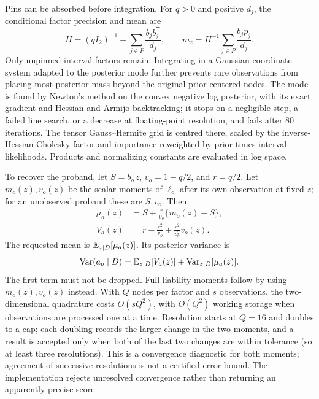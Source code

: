 Pins can be absorbed before integration. For $q>0$ and positive $d_j$, the
conditional factor precision and mean are
\begin{equation}
 H=(qI_2)^{-1}+\sum_{j\in P}\frac{b_jb_j^\mathsf{T}}{d_j},\qquad
 m_z=H^{-1}\sum_{j\in P}\frac{b_jp_j}{d_j}.
 \label{eq:factor-pins}
\end{equation}
Only unpinned interval factors remain. Integrating in a Gaussian coordinate
system adapted to the posterior mode further prevents rare observations
from placing most posterior mass beyond the original prior-centered nodes.
The mode is found by Newton's method on the convex negative log
posterior, with its exact gradient and Hessian and Armijo backtracking; it
stops on a negligible step, a failed line search, or a decrease at
floating-point resolution, and fails after $80$ iterations. The tensor
Gauss--Hermite grid is centred there, scaled by the inverse-Hessian Cholesky
factor and importance-reweighted by prior times interval likelihoods.
Products and normalizing constants are evaluated in log space.

To recover the proband, let $S=b_o^\mathsf{T}z$, $v_o=1-q/2$, and
$r=q/2$. Let $m_o(z),v_o(z)$ be the scalar moments of $\ell_o$ after its own
observation at fixed $z$; for an unobserved proband these are $S,v_o$.
Then
\begin{align}
 \mu_a(z)&=S+\frac{r}{v_o}\{m_o(z)-S\},\label{eq:factor-target-mean}\\
 V_a(z)&=r-\frac{r^2}{v_o}+\frac{r^2}{v_o^2}v_o(z).
 \label{eq:factor-target-var}
\end{align}
The requested mean is $\mathbb{E}_{z\mid D}[\mu_a(z)]$. Its posterior variance is
\begin{equation}
 \mathrm{Var}(a_o\mid D)=\mathbb{E}_{z\mid D}[V_a(z)]
                  +\mathrm{Var}_{z\mid D}[\mu_a(z)].
 \label{eq:factor-total-var}
\end{equation}
The first term must not be dropped. Full-liability moments follow by using
$m_o(z),v_o(z)$ instead. With $Q$ nodes per factor and $s$ observations,
the two-dimensional quadrature costs $O(sQ^2)$, with $O(Q^2)$ working storage
when observations are processed one at a time. Resolution starts at $Q=16$
and doubles to a cap; each doubling records the larger change in the two
moments, and a result is accepted only when both of the last two changes are
within tolerance (so at least three resolutions). This is a convergence
diagnostic for both moments; agreement of successive resolutions is not a
certified error bound. The implementation rejects
unresolved convergence rather than returning an apparently precise score.

